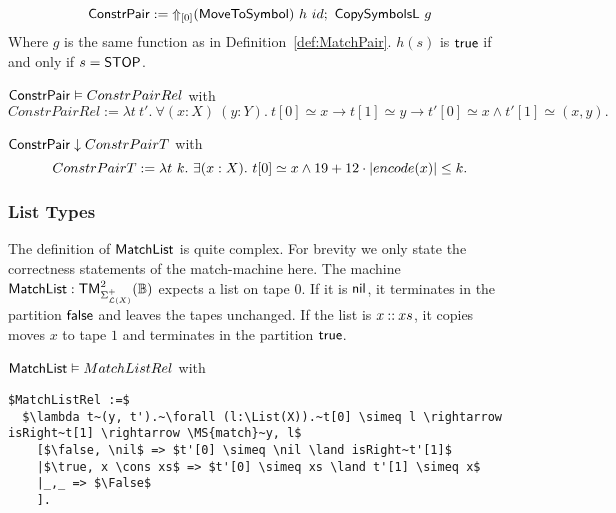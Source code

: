 \begin{definition}
  \label{def:Constr_pair}
  ~
  \[
    \MS{ConstrPair} := \LiftTapes{(\MS{MoveToSymbol})}{\Vector{0}}~h~id \Seq \MS{CopySymbolsL}~g
  \]
  Where $g$ is the same function as in Definition~\ref{def:MatchPair}.  $h(s)$ is $\true$ if and only if $s=\MS{STOP}$.
\end{definition}

\begin{lemma}
  \label{lem:Constr_pair_Realise}
  \small
  $\MS{ConstrPair} \Realise ConstrPairRel$ with
  \[
    ConstrPairRel := \lambda t~t'.~\forall (x:X)~(y:Y).~t[0] \simeq x \rightarrow t[1] \simeq y \rightarrow t'[0] \simeq x \land t'[1] \simeq (x,y).
  \]
\end{lemma}
\begin{lemma}
  \label{lem:Constr_pair_TerminatesIn}
  $\MS{ConstrPair} \TerminatesIn ConstrPairT$ with
  \[
    ConstrPairT := \lambda t~k.~\exists (x: X).~t[0] \simeq x \land 19 + 12 \cdot \size{x} \leq k.
  \]
\end{lemma}

\subsubsection{List Types}
\label{sec:MatchList}
%

The definition of $\MS{MatchList}$ is quite complex.  For brevity we only state the correctness statements of the match-machine here.  The machine
$\MS{MatchList} : \TM_{\Sigma_{\List(X)}^+}^2(\Bool)$ expects a list on tape $0$.  If it is $\nil$, it terminates in the partition $\false$ and leaves
the tapes unchanged.  If the list is $x \cons xs$, it copies moves $x$ to tape $1$ and terminates in the partition $\true$.

\begin{lemma}
  \label{lem:MatchList_Realise}
  $\MS{MatchList} \Realise MatchListRel$ with
\begin{lstlisting}[style=semicoqstyle]
$MatchListRel :=$
  $\lambda t~(y, t').~\forall (l:\List(X)).~t[0] \simeq l \rightarrow isRight~t[1] \rightarrow \MS{match}~y, l$
    [$\false, \nil$ => $t'[0] \simeq \nil \land isRight~t'[1]$
    |$\true, x \cons xs$ => $t'[0] \simeq xs \land t'[1] \simeq x$
    |_,_ => $\False$
    ].
\end{lstlisting}
\end{lemma}


